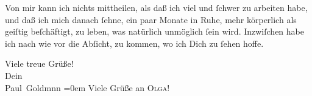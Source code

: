 \pstart
           Von mir kann ich nichts mittheilen, als daß ich viel und{ }ſchwer zu arbeiten habe, und
               daß ich mich danach{ }ſehne, ein paar Monate in Ruhe, mehr körperlich als geiſtig
               beſchäftigt, zu leben, was natürlich unmöglich{ }ſein wird. Inzwiſchen habe ich {\pb}nach wie vor die Abſicht, \label{K_L03210-2v}\label{K_L03210-2} zu kommen, wo ich
               Dich zu{ }ſehen hoffe.\pend
           
\pstart
           Viele treue Grüße! {\\[\baselineskip]}Dein {\\[\baselineskip]}\spacefill\mbox{Paul Goldmnn}\pend
           \leftskip=0em{}
\pstart
           \noindent{}Viele Grüße an \textsc{Olga}!\pend
           \endnumbering{}  \newcommand{\dateiname}{L03210}\newcommand{\titel}{Paul Goldmann an Arthur Schnitzler, 9. 6. [1902]}\newcommand{\editorInnen}{Martin Anton Müller und Laura Untner}
